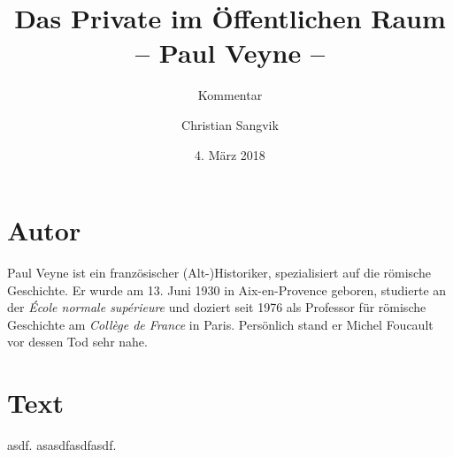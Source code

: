 \documentclass[a4paper,ngerman,11pt]{scrartcl}
\subtitle{Kommentar}
\author{Christian Sangvik}
\date{4. März 2018}
\title{Das Private im Öffentlichen Raum\\-- Paul Veyne --}
\begin{document}
\maketitle

\section{Autor}
\label{sec-1}

Paul Veyne ist ein französischer (Alt-)Historiker, spezialisiert auf die
römische Geschichte. Er wurde am 13. Juni 1930 in Aix-en-Provence geboren,
studierte an der \emph{École normale supérieure} und doziert seit 1976 als
Professor für römische Geschichte am \emph{Collège de France} in Paris. Persönlich
stand er Michel Foucault vor dessen Tod sehr nahe.\cite{wiki:PaulVeyne-de}

\section{Text}
\label{sec-2}

asdf.\cite{Veyne1989} asasdfasdfasdf.\cite{Veyne1989}



\end{document}
